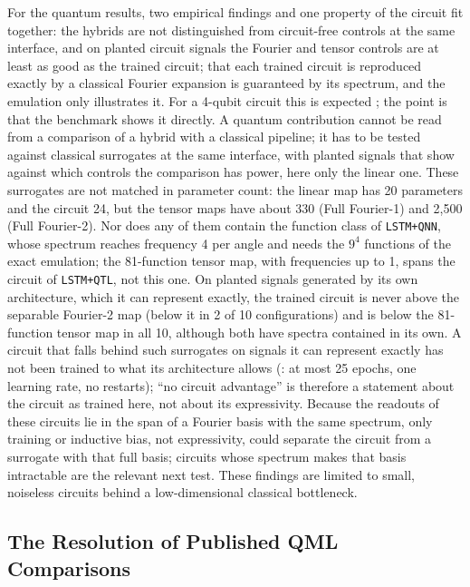 \documentclass[11pt,a4paper]{article}
\begin{document}
For the quantum results, two empirical findings and one property of the circuit fit together: the hybrids are not distinguished from circuit-free controls at the same interface, and on planted circuit signals the Fourier and tensor controls are at least as good as the trained circuit; that each trained circuit is reproduced exactly by a classical Fourier expansion is guaranteed by its spectrum, and the emulation only illustrates it. For a 4-qubit circuit this is expected \citep{schreiber2023,sweke2025}; the point is that the benchmark shows it directly. A quantum contribution cannot be read from a comparison of a hybrid with a classical pipeline; it has to be tested against classical surrogates at the same interface, with planted signals that show against which controls the comparison has power, here only the linear one. These surrogates are not matched in parameter count: the linear map has 20 parameters and the circuit 24, but the tensor maps have about 330 (Full Fourier-1) and 2{,}500 (Full Fourier-2). Nor does any of them contain the function class of \texttt{LSTM+QNN}, whose spectrum reaches frequency 4 per angle and needs the $9^4$ functions of the exact emulation; the 81-function tensor map, with frequencies up to 1, spans the circuit of \texttt{LSTM+QTL}, not this one. On planted signals generated by its own architecture, which it can represent exactly, the trained circuit is never above the separable Fourier-2 map (below it in 2 of 10 configurations) and is below the 81-function tensor map in all 10, although both have spectra contained in its own. A circuit that falls behind such surrogates on signals it can represent exactly has not been trained to what its architecture allows (: at most 25 epochs, one learning rate, no restarts); ``no circuit advantage'' is therefore a statement about the circuit as trained here, not about its expressivity. Because the readouts of these circuits lie in the span of a Fourier basis with the same spectrum, only training or inductive bias, not expressivity, could separate the circuit from a surrogate with that full basis; circuits whose spectrum makes that basis intractable are the relevant next test. These findings are limited to small, noiseless circuits behind a low-dimensional classical bottleneck.

\subsection{The Resolution of Published QML Comparisons}
\label{sec:literature}
\end{document}
